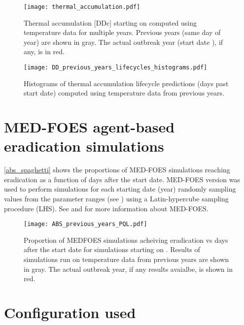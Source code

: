 \documentclass[10pt]{article}
\begin{document}
\begin{figure}[H]
\centering
\texttt{[image: thermal\_accumulation.pdf]}
\caption{
\label{dd_spaghetti}
Thermal accumulation [DDc] starting on \VarStartDOY 
computed using \VarStation temperature data for multiple years.
Previous years (same day of year) are shown in gray.
The actual outbreak year (start date \VarStartDate), if any, is in red.}
\end{figure}

\begin{figure}[H]
\centering
\texttt{[image: DD\_previous\_years\_lifecycles\_histograms.pdf]}
\caption{
\label{dd_hists}
Histograms of thermal accumulation lifecycle predictions (days past start date) 
computed using temperature data from previous years.
}
\end{figure}

\section*{MED-FOES agent-based eradication simulations}

\autoref{abs_spaghetti} shows the proportions of MED-FOES simulations 
reaching eradication as a function of days after the start date.
MED-FOES version \VarMEDFOESVersion was used 
to perform \VarMFPnR simulations for each starting date (year)
randomly sampling values from the parameter ranges (see )
using a Latin-hypercube sampling procedure (LHS).
See \citet{manoukis_computer_2014} and \citet{manoukis_agent-based_2014} %
for more information about MED-FOES.


\begin{figure}[H]
\centering
\texttt{[image: ABS\_previous\_years\_PQL.pdf]}
\caption{
\label{abs_spaghetti}
Proportion of MEDFOES simulations acheiving eradication vs days after the start date 
for simulations starting on \VarStartDOY.
Results of simulations run on temperature data from previous years are shown in gray.
The actual outbreak year, if any results avaialbe, is shown in red.
}
\end{figure}


\nocite{*}

{\small
}

\clearpage
\section*{Configuration used}\label{configuration}
%


%
\end{document}

